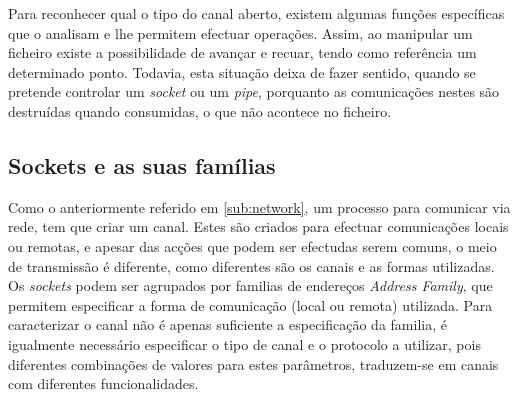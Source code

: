 
Para reconhecer qual o tipo do canal aberto, existem algumas funções específicas que o analisam e lhe permitem efectuar operações.
Assim, ao manipular um ficheiro existe a possibilidade de avançar e recuar, tendo como referência um determinado ponto.
Todavia, esta situação deixa de fazer sentido, quando se pretende controlar um \textit{socket} ou um \textit{pipe}, porquanto as comunicações nestes são destruídas quando consumidas, o que não acontece no ficheiro.
 




\subsection{Sockets e as suas famílias}
\label{sub:sockets}



Como o anteriormente referido em \ref{sub:network}, um processo para comunicar via rede, tem que criar um canal.
Estes são criados para efectuar comunicações locais ou remotas, e apesar das acções que podem ser efectudas serem comuns, o meio de transmissão é diferente, como diferentes são os canais e as formas utilizadas.
Os \textit{sockets} podem ser agrupados por familias de endereços \textit{Address Family}, que permitem especificar a forma de comunicação (local ou remota) utilizada.
Para caracterizar o canal não é apenas suficiente a especificação da familia, é igualmente necessário especificar o tipo de canal e o protocolo a utilizar, pois diferentes combinações de valores para estes parâmetros, traduzem-se em canais com diferentes funcionalidades.

